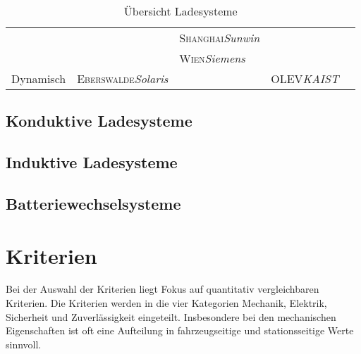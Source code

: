 \documentclass{scrreprt}
\begin{document}
\begin{table}[htbp]
\begin{tabularx}{\linewidth}{lp{2.1cm}p{2.1cm}XX}
		                           &                                           & \textsc{Shanghai}\newline\emph{Sunwin} &                                       &  \\
		                           &                                           & \textsc{Wien}\newline\emph{Siemens}    &                                       &  \\ \midrule
		\multirow{2}{*}{Dynamisch} & \textsc{Eberswalde}\newline\emph{Solaris} &                                        & OLEV\newline\emph{KAIST}              &  \\ \bottomrule
	\end{tabularx}
	\caption{Übersicht Ladesysteme}
	\label{übersichtLadesysteme}
\end{table}

\subsection{Konduktive Ladesysteme}                                                

\subsection{Induktive Ladesysteme}

\subsection{Batteriewechselsysteme}

\section{Kriterien}
Bei der Auswahl der Kriterien liegt Fokus auf quantitativ vergleichbaren Kriterien. Die Kriterien werden in die vier Kategorien Mechanik, Elektrik, Sicherheit und Zuverlässigkeit eingeteilt. Insbesondere bei den mechanischen Eigenschaften ist oft eine Aufteilung in fahrzeugseitige und stationsseitige Werte sinnvoll.
\end{document}
